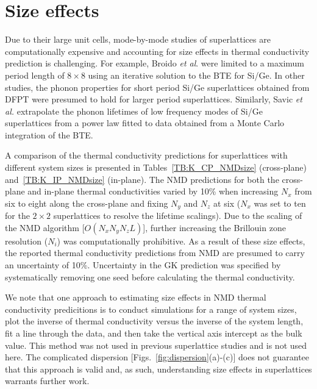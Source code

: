 \documentclass[aps,prb,preprint,preprintnumbers,amsmath,amssymb,floatfix,superscriptaddress]{revtex4}
\begin{document}
\newpage
\appendix
\section{Size effects}\label{app:size effects}
Due to their large unit cells, mode-by-mode studies of superlattices are computationally expensive and accounting for size effects in thermal conductivity prediction is challenging. For example, Broido \textit{et al}. were limited to a maximum period length of $8\times 8$ using an iterative solution to the BTE for Si/Ge.\cite {PhysRevB.70.081310} In other studies, the phonon properties for short period Si/Ge superlattices obtained from DFPT were presumed to hold for larger period superlattices.\cite{Luckyanova16112012, doi:10.1021/nl202186y} Similarly, Savic \textit{et al.} extrapolate the phonon lifetimes of low frequency modes of Si/Ge superlattices from a power law fitted to data obtained from a Monte Carlo integration of the BTE.\cite{savic:073113} 

A comparison of the thermal conductivity predictions for superlattices with different system sizes is presented in Tables~\ref{TB:K_CP_NMDsize} (cross-plane) and~\ref{TB:K_IP_NMDsize} (in-plane). The NMD predictions for both the cross-plane and in-plane thermal conductivities varied by 10\% when increasing $N_x$ from six to eight along the cross-plane and fixing $N_y$ and $N_z$ at six ($N_x$ was set to ten for the $2\times2$ superlattices to resolve the lifetime scalings). Due to the scaling of the NMD algorithm [$O(N_xN_yN_z L)$], further increasing the Brillouin zone resolution ($N_i$) was computationally prohibitive. As a result of these size effects, the reported thermal conductivity predictions from NMD are presumed to carry an uncertainty of 10\%. Uncertainty in the GK prediction was specified by systematically removing one seed before calculating the thermal conductivity.

We note that one approach to estimating size effects in NMD thermal conductivity predicitions is to conduct simulations for a range of system sizes, plot the inverse of thermal conductivity versus the inverse of the system length, fit a line through the data, and then take the vertical axis intercept as the bulk value.\cite{PhysRevB.81.214305} This method was not used in previous superlattice studies \cite{doi:10.1021/nl202186y,savic:073113,Luckyanova16112012} and is not used here. The complicated dispersion [Figs.~\ref{fig:dispersion}(a)-(c)] does not guarantee that this approach is valid and, as such, understanding size effects in superlattices warrants further work.
\end{document}

